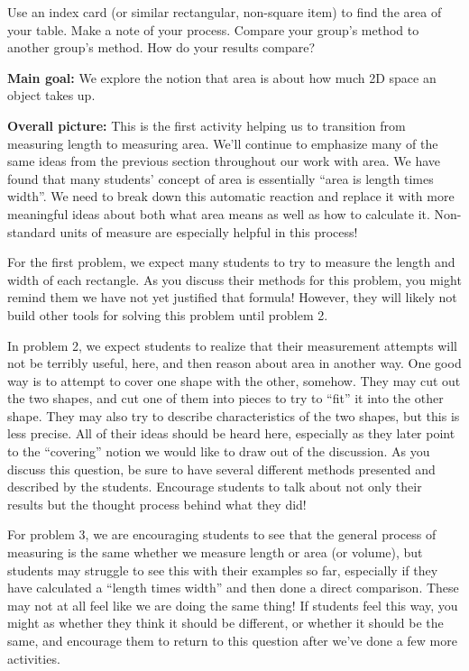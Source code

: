 \documentclass[nooutcomes,noauthor, handout]{ximera}
\begin{document}
\begin{problem}
Use an index card (or similar rectangular, non-square item) to find the area of your table.  Make a note of your process.  Compare your group's method to another group's method.  How do your results compare?

\end{problem}



\pagebreak


\begin{instructorNotes}
{\bf Main goal:} We explore the notion that area is about how much 2D space an object takes up.

{\bf Overall picture:}
This is the first activity helping us to transition from measuring length to measuring area. We'll continue to emphasize many of the same ideas from the previous section throughout our work with area. We have found that many students' concept of area is essentially ``area is length times width''. We need to break down this automatic reaction and replace it with more meaningful ideas about both what area means as well as how to calculate it. Non-standard units of measure are especially helpful in this process!

For the first problem, we expect many students to try to measure the length and width of each rectangle. As you discuss their methods for this problem, you might remind them we have not yet justified that formula! However, they will likely not build other tools for solving this problem until problem 2.

In problem 2, we expect students to realize that their measurement attempts will not be terribly useful, here, and then reason about area in another way.  One good way is to attempt to cover one shape with the other, somehow. They may cut out the two shapes, and cut one of them into pieces to try to ``fit'' it into the other shape. They may also try to describe characteristics of the two shapes, but this is less precise. All of their ideas should be heard here, especially as they later point to the ``covering'' notion we would like to draw out of the discussion. As you discuss this question, be sure to have several different methods presented and described by the students. Encourage students to talk about not only their results but the thought process behind what they did!

For problem 3, we are encouraging students to see that the general process of measuring is the same whether we measure length or area (or volume), but students may struggle to see this with their examples so far, especially if they have calculated a ``length times width'' and then done a direct comparison. These may not at all feel like we are doing the same thing! If students feel this way, you might as whether they think it should be different, or whether it should be the same, and encourage them to return to this question after we've done a few more activities.


\end{instructorNotes}
\end{document}
